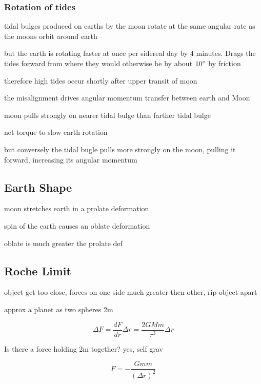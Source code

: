 \documentclass{article}
\begin{document}
\subsubsection{Rotation of tides}
\begin{list}{-}{}
\item tidal bulges produced on earths by the moon rotate at the same angular rate as the moons orbit around earth
\item but the earth is rotating faster at once per sidereal day by 4 minutes. Drags the tides forward from where they would otherwise be by about $10\degree$ by friction
\begin{list}{-}{}
\item therefore high tides occur shortly after upper transit of moon
\item the misalignment drives angular momentum transfer between earth and Moon
\begin{list}{-}{}
\item moon pulls strongly on nearer tidal bulge than farther tidal bulge
\item net torque to slow earth rotation
\item but conversely the tidal bugle pulls more strongly on the moon, pulling it forward, increasing its angular momentum
\end{list}
\end{list}

\end{list}

\subsection{Earth Shape}
\begin{list}{-}{}
\item moon stretches earth in a prolate deformation 
\item spin of the earth causes an oblate deformation 
\item oblate is much greater the prolate def
\end{list}

\subsection{Roche Limit}
\begin{list}{-}{}
\item object get too close, forces on one side much greater then other, rip object apart
\item approx a planet as two spheres 2m 
\item \[\Delta F = \frac{dF}{dr}\Delta r = \frac{2GMm}{r^3}\Delta r\]
\item Is there a force holding 2m together? yes, self grav
\item \[F = -\frac{Gmm}{(\Delta r)^2}\]
\end{list}
\end{document}
